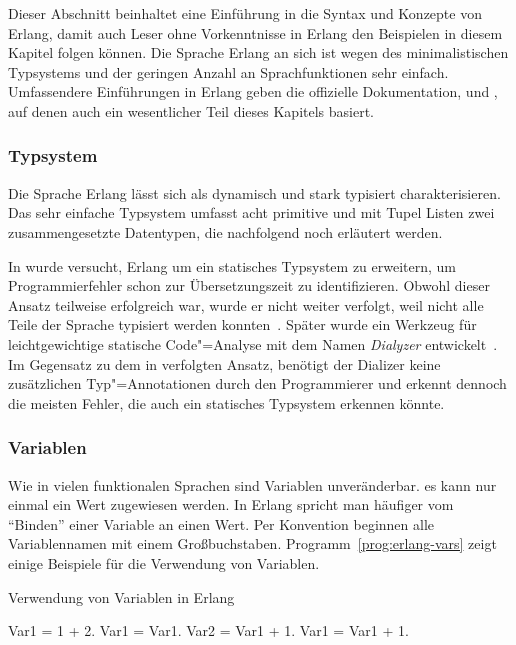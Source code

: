 Dieser Abschnitt beinhaltet eine Einführung in die Syntax und Konzepte von Erlang, damit auch Leser ohne Vorkenntnisse in Erlang den Beispielen in diesem Kapitel folgen können. Die Sprache Erlang an sich ist wegen des minimalistischen Typsystems und der geringen Anzahl an Sprachfunktionen sehr einfach. Umfassendere Einführungen in Erlang geben die offizielle Dokumentation, \cite{Hebert:2013:LYE:2543986} und \cite{armstrong03}, auf denen auch ein wesentlicher Teil dieses Kapitels basiert.

\subsubsection{Typsystem}
\label{subsubsec:erlang-typesystem}

Die Sprache Erlang lässt sich als dynamisch und stark typisiert charakterisieren. Das sehr einfache Typsystem umfasst acht primitive und mit Tupel \bzw Listen zwei zusammengesetzte Datentypen, die nachfolgend noch erläutert werden.

In \cite{Marlow:1997:PSS:258948.258962} wurde versucht, Erlang um ein statisches Typsystem zu erweitern, um Programmierfehler schon zur Übersetzungszeit zu identifizieren. Obwohl dieser Ansatz teilweise erfolgreich war, wurde er nicht weiter verfolgt, weil nicht alle Teile der Sprache typisiert werden konnten~\cite[14]{Armstrong:2007:HE:1238844.1238850}. Später wurde ein Werkzeug für leichtgewichtige statische Code"=Analyse mit dem Namen \textit{Dialyzer} entwickelt~\cite{ErlangWarStory}. Im Gegensatz zu dem in \cite{Marlow:1997:PSS:258948.258962} verfolgten Ansatz, benötigt der Dializer keine zusätzlichen Typ"=Annotationen durch den Programmierer und erkennt dennoch die meisten Fehler, die auch ein statisches Typsystem erkennen könnte.

\subsubsection{Variablen}

Wie in vielen funktionalen Sprachen sind Variablen unveränderbar. \Dah es kann nur einmal ein Wert zugewiesen werden. In Erlang spricht man häufiger vom "`Binden"' einer Variable an einen Wert. Per Konvention beginnen alle Variablennamen mit einem Großbuchstaben. Programm~\ref{prog:erlang-vars} zeigt einige Beispiele für die Verwendung von Variablen.

\begin{program}[!hbt]
\caption{Verwendung von Variablen in Erlang}
\label{prog:erlang-vars}
\begin{ErlangCode}
Var1 = 1 + 2.
Var1 = Var1. %
Var2 = Var1 + 1. %
Var1 = Var1 + 1. %
\end{ErlangCode}
\end{program}

